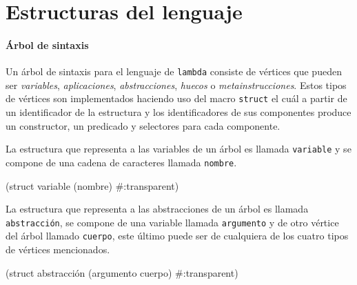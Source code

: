 \documentclass[letterpaper,twoside,openright,11pt]{book}
\begin{document}
\nwenddocs{}\section*{Estructuras del lenguaje}

\nwenddocs{}\paragraph{Árbol de sintaxis}

Un árbol de sintaxis para el lenguaje de {\tt{}lambda} consiste de vértices que pueden ser \emph{variables}, \emph{aplicaciones}, \emph{abstracciones}, \emph{huecos} o \emph{metainstrucciones}. Estos tipos de vértices son implementados haciendo uso del macro {\tt{}struct} el cuál a partir de un identificador de la estructura y los identificadores de sus componentes produce un constructor, un predicado y selectores para cada componente.

La estructura que representa a las variables de un árbol es llamada {\tt{}\protect{}variable} y se compone de una cadena de caracteres llamada {\tt{}nombre}.

\nwenddocs{}\endmoddef
(struct variable (nombre) #:transparent)

\eatline
{}\nwendcode{}\nwdocspar

La estructura que representa a las abstracciones de un árbol es llamada {\tt{}\protect{}abstracción}, se compone de una variable llamada {\tt{}argumento} y de otro vértice del árbol llamado {\tt{}cuerpo}, este último puede ser de cualquiera de los cuatro tipos de vértices mencionados.


\nwenddocs{}\plusendmoddef
(struct abstracción (argumento cuerpo) #:transparent)
\end{document}
